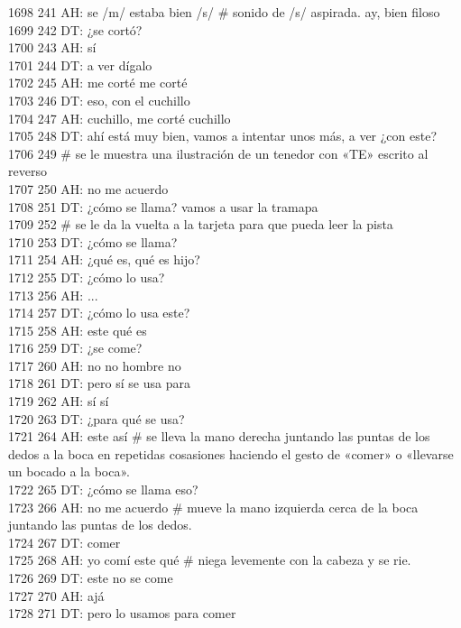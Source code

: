 1698 241 AH: se /m/ estaba bien /s/ # sonido de /s/ aspirada. ay, bien filoso\\
1699 242 DT: ¿se cortó?\\
1700 243 AH: sí\\
1701 244 DT: a ver dígalo\\
1702 245 AH: me corté me corté\\
1703 246 DT: eso, con el cuchillo\\
1704 247 AH: cuchillo, me corté cuchillo\\
1705 248 DT: ahí está muy bien, vamos a intentar unos más, a ver ¿con este?\\
1706 249 # se le muestra una ilustración de un tenedor con «TE» escrito al reverso\\
1707 250 AH: no me acuerdo\\
1708 251 DT: ¿cómo se llama? vamos a usar la tramapa\\
1709 252 # se le da la vuelta a la tarjeta para que pueda leer la pista\\
1710 253 DT: ¿cómo se llama?\\
1711 254 AH: ¿qué es, qué es hijo?\\
1712 255 DT: ¿cómo lo usa?\\
1713 256 AH: ...\\
1714 257 DT: ¿cómo lo usa este?\\
1715 258 AH: este qué es\\
1716 259 DT: ¿se come?\\
1717 260 AH: no no hombre no\\
1718 261 DT: pero sí se usa para\\
1719 262 AH: sí sí\\
1720 263 DT: ¿para qué se usa?\\
1721 264 AH: este así # se lleva la mano derecha juntando las puntas de los dedos a la boca en repetidas cosasiones haciendo el gesto de «comer» o «llevarse un bocado a la boca».\\
1722 265 DT: ¿cómo se llama eso?\\
1723 266 AH: no me acuerdo # mueve la mano izquierda cerca de la boca juntando las puntas de los dedos.\\
1724 267 DT: comer\\
1725 268 AH: yo comí este qué # niega levemente con la cabeza y se rie.\\
1726 269 DT: este no se come\\
1727 270 AH: ajá\\
1728 271 DT: pero lo usamos para comer\\

